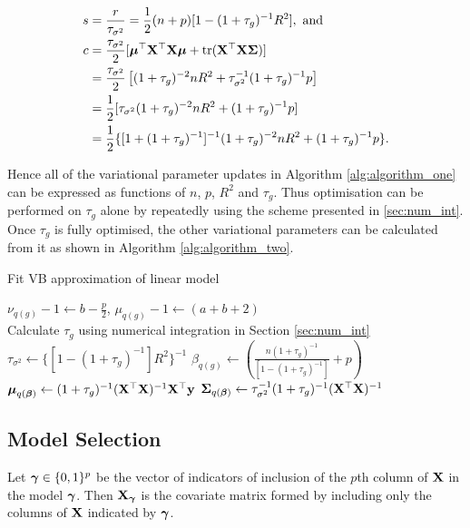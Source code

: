 \documentclass{amsart}[12pt]
\begin{document}
\begin{align*}
	s & = \frac{r}{\tau_{\sigma^2}} = \frac{1}{2} (n + p) [1 - (1 + \tau_g)^{-1} R^2], \text{ and }                \\
	c & = \frac{\tau_{\sigma^2}}{2}[{\boldsymbol \mu}^\top {\bf X}^\top {\bf X} {\boldsymbol\mu} + \text{tr} ({\bf X}^\top {\bf X} {\boldsymbol\Sigma})]                      \\
	  & = \frac{\tau_{\sigma^2}}{2}\left[(1 + \tau_g)^{-2} n R^2 + \tau_{\sigma^2}^{-1} (1 + \tau_g)^{-1} p\right] \\
	  & = \frac{1}{2} [ \tau_{\sigma^2} (1 + \tau_g)^{-2} n R^2 + (1 + \tau_g)^{-1} p]                             \\
	  & = \frac{1}{2} \{ [1 + (1 + \tau_g)^{-1}]^{-1} (1 + \tau_g)^{-2} n R^2 + (1 + \tau_g)^{-1} p\}.             
\end{align*}

\noindent Hence all of the variational parameter updates in Algorithm \ref{alg:algorithm_one} can be expressed as functions
of $n$, $p$, $R^2$ and $\tau_g$. Thus optimisation can be performed on $\tau_g$ alone by repeatedly using the
scheme presented in \ref{sec:num_int}. Once $\tau_g$ is fully optimised, the other variational parameters can
be calculated from it as shown in Algorithm \ref{alg:algorithm_two}.

\begin{algorithm}
	\caption{Fit VB approximation of linear model}
	\label{alg:algorithm_two}
	\begin{algorithmic}
		\REQUIRE $\nu_{q(g)} - 1 \leftarrow b - \frac{p}{2}$, $\mu_{q(g)} - 1 \leftarrow (a + b + 2)$ \\
		\STATE Calculate $\tau_{g}$ using numerical integration in Section \ref{sec:num_int}
		\ENDWHILE
		\STATE $\tau_{\sigma^2} \leftarrow \{[1 - (1 + \tau_g)^{-1}] R^2\}^{-1}$
		\STATE $\beta_{q(g)} \leftarrow \left(\frac{n (1 + \tau_g)^{-1}}{[1 - (1 + \tau_g)^{-1}]} + p \right)$
		\STATE ${\boldsymbol \mu}_{q({\boldsymbol \beta})} \leftarrow (1 + \tau_g)^{-1} ({\bf X}^\top {\bf X})^{-1} {\bf X}^\top {\bf y}$
		\STATE ${\boldsymbol \Sigma}_{q({\boldsymbol \beta})} \leftarrow \tau_{\sigma^2}^{-1} (1 + \tau_{g})^{-1}({\bf X}^\top {\bf X})^{-1}$
	\end{algorithmic}
\end{algorithm}

\subsection{Model Selection}

Let ${\boldsymbol \gamma} \in \{0, 1\}^p$ be the vector of indicators of inclusion of the $p$th column of ${\bf X}$ in the
model ${\boldsymbol \gamma}$. Then ${\bf X}_{\boldsymbol \gamma}$ is the covariate matrix formed by including only the columns of ${\bf X}$
indicated by ${\boldsymbol \gamma}$.
\end{document}
